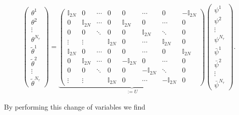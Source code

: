 \documentclass{article}
\begin{document}
\begin{align}
	\begin{pmatrix}
		\theta^1 \\
		\theta^2 \\
		\vdots \\
		\theta^{N_\tau} \\
		\tilde{\theta}^1 \\
		\tilde{\theta}^2 \\
		\vdots \\
		\tilde{\theta}^{N_\tau}
	\end{pmatrix}
	=
	\underbrace{
		\left(
		\begin{array}{cccc|cccc}
			\mathbb{I}_{2N} & 0 & \cdots & 0 & 0 & \cdots & 0 & -\mathbb{I}_{2N} \\
			0 & \mathbb{I}_{2N} & \cdots & 0 & \mathbb{I}_{2N} & 0 & \cdots & 0 \\
			0 & 0 & \ddots & 0 & 0 & \mathbb{I}_{2N} & \ddots & 0 \\
			\vdots & \vdots & & \mathbb{I}_{2N} & 0 & \cdots & \mathbb{I}_{2N} & 0 \\
			\hline
			\mathbb{I}_{2N} & 0 & \cdots & 0 & 0 & \cdots & 0 & \mathbb{I}_{2N} \\
			0 & \mathbb{I}_{2N} & \cdots & 0 & -\mathbb{I}_{2N} & 0 & \cdots & 0 \\
			0 & 0 & \ddots & 0 & 0 & -\mathbb{I}_{2N} & \ddots & 0 \\
			\vdots & \vdots & & \mathbb{I}_{2N} & 0 & \cdots & -\mathbb{I}_{2N} & 0
		\end{array}
		\right)
	}_{:= U}
	\begin{pmatrix}
		\psi^1 \\
		\psi^2 \\
		\vdots \\
		\psi^{N_\tau} \\
		\bar{\psi}^1 \\
		\bar{\psi}^2 \\
		\vdots \\
		\bar{\psi}^{N_\tau}
	\end{pmatrix}.
\end{align}

By performing this change of variables we find
\end{document}
